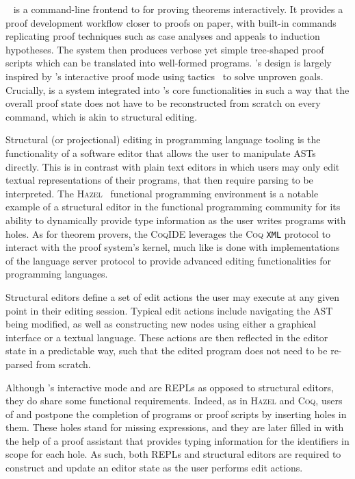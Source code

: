 
\Harpoon~\cite{errington2021harpoon} is a command-line frontend to \Beluga for proving theorems interactively.
It provides a proof development workflow closer to proofs on paper, with built-in commands replicating proof techniques such as case analyses and appeals to induction hypotheses.
The system then produces verbose yet simple tree-shaped proof scripts which can be translated into well-formed \Beluga programs.
\Harpoon's design is largely inspired by \Coq's interactive proof mode using tactics~\cite{delahaye2000tactic} to solve unproven goals.
Crucially, \Harpoon is a system integrated into \Beluga's core functionalities in such a way that the overall proof state does not have to be reconstructed from scratch on every command, which is akin to structural editing.


Structural (or projectional) editing in programming language tooling is the functionality of a software editor that allows the user to manipulate \acp{AST} directly.
This is in contrast with plain text editors in which users may only edit textual representations of their programs, that then require parsing to be interpreted.
The \textsc{Hazel}~\cite{omar2017hazelnut, omar2019live} functional programming environment is a notable example of a structural editor in the functional programming community for its ability to dynamically provide type information as the user writes programs with holes.
As for theorem provers, the \textsc{CoqIDE} leverages the \textsc{Coq} \texttt{XML} protocol to interact with the proof system's kernel, much like is done with implementations of the language server protocol to provide advanced editing functionalities for programming languages.


Structural editors define a set of edit actions the user may execute at any given point in their editing session.
Typical edit actions include navigating the \ac{AST} being modified, as well as constructing new nodes using either a graphical interface or a textual language.
These actions are then reflected in the editor state in a predictable way, such that the edited program does not need to be re-parsed from scratch.


Although \Beluga's interactive mode and \Harpoon are \acp{REPL} as opposed to structural editors, they do share some functional requirements.
Indeed, as in \textsc{Hazel} and \textsc{Coq}, users of \Beluga and \Harpoon postpone the completion of programs or proof scripts by inserting holes in them.
These holes stand for missing expressions, and they are later filled in with the help of a proof assistant that provides typing information for the identifiers in scope for each hole.
As such, both \acp{REPL} and structural editors are required to construct and update an editor state as the user performs edit actions.

